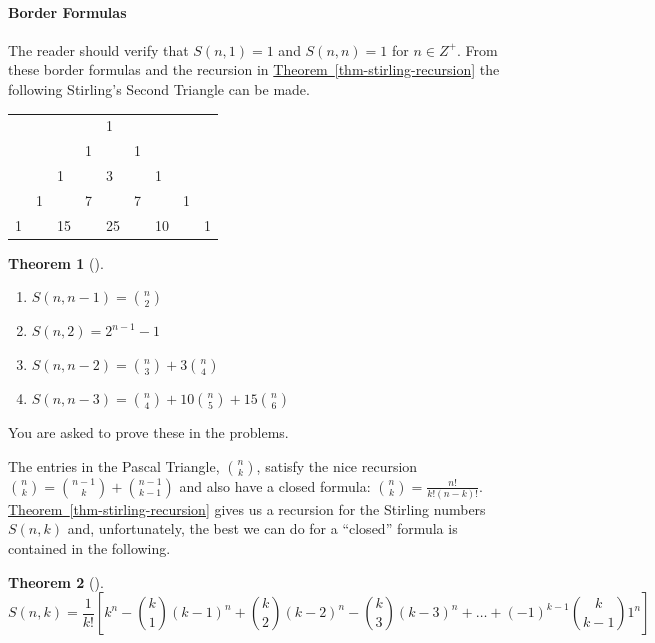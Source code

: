 \documentclass[10pt,]{book}
\theoremstyle{plain}
\newtheorem{theorem}{Theorem}[section]
\theoremstyle{definition}
\theoremstyle{definition}
\theoremstyle{definition}
\theoremstyle{definition}
\numberwithin{equation}{chapter}
\begin{document}
\paragraph[{Border Formulas}]{Border Formulas}\hypertarget{paragraphs-14}{}
\hypertarget{p-1181}{}%
The reader should verify that \(S(n,1) = 1\) and \(S(n,n) = 1\) for \(n \in Z^{+}\). From these border formulas and the recursion in \hyperref[thm-stirling-recursion]{Theorem~\ref{thm-stirling-recursion}} the following Stirling's Second Triangle can be made.%
\begin{sidebyside}{1}{0.25}{0.25}{0}
\begin{sbspanel}{0.5}
{\centering%
\begin{tabular}{lllllllll}
&&&&1&&&&\tabularnewline[0pt]
&&&1&&1&&&\tabularnewline[0pt]
&&1&&3&&1&&\tabularnewline[0pt]
&1&&7&&7&&1&\tabularnewline[0pt]
1&&15&&25&&10&&1
\end{tabular}
\par}
\end{sbspanel}
\end{sidebyside}
\begin{theorem}[{}]\label{thm-stirling-border}
\hypertarget{p-1182}{}%
\leavevmode%
\begin{enumerate}
\item\hypertarget{li-215}{}\hypertarget{p-1183}{}%
\(S\left( n,n - 1 \right) =\binom{n}{2}\)%
\item\hypertarget{li-216}{}\hypertarget{p-1184}{}%
\(S\left( n,2 \right) = 2^{n - 1} - 1\)%
\item\hypertarget{li-217}{}\hypertarget{p-1185}{}%
\(S\left( n,n - 2 \right) =\binom{n}{3}
+ 3\binom{n}{4}\)%
\item\hypertarget{li-218}{}\hypertarget{p-1186}{}%
\(S\left( n,n - 3 \right) =\binom{n}{4}
+ 10\binom{n}{5}
+ 15\binom{n}{6}\)%
\end{enumerate}
%
\end{theorem}
\hypertarget{p-1187}{}%
You are asked to prove these in the problems.%
\par
\hypertarget{p-1188}{}%
The entries in the Pascal Triangle, \(\binom{n}{k}\), satisfy the nice recursion \(\binom{n}{k} = \binom{n - 1}{k} + \binom{n - 1}{k - 1}\) and also have a closed formula: \(\binom{n}{k} = \frac{n!}{k!(n - k)!}\). \hyperref[thm-stirling-recursion]{Theorem~\ref{thm-stirling-recursion}} gives us a recursion for the Stirling numbers \(S(n,k)\) and, unfortunately, the best we can do for a ``closed'' formula is contained in the following.%
\begin{theorem}[{}]\label{thm-stirling-closed}
\hypertarget{p-1189}{}%
%
\begin{equation*}
S(n,k) = \frac{1}{k!}\left[k^{n} - \binom{k}{1} \left( k - 1 \right)^{n} + \binom{k}{2} \left( k - 2 \right)^{n} - \binom{k}{3} \left( k - 3 \right)^{n} + \ldots + \left( - 1 \right)^{k - 1}\binom{k}{k - 1} 1^{n} \right] 
\end{equation*}
%
\end{theorem}
\end{document}
